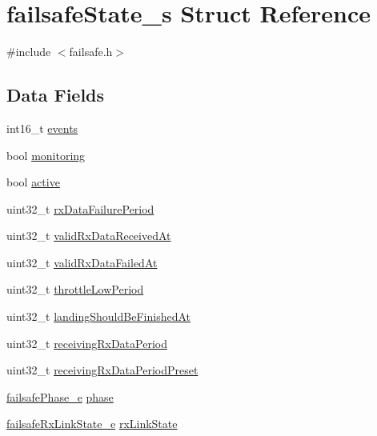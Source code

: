\hypertarget{structfailsafeState__s}{\section{failsafe\+State\+\_\+s Struct Reference}
\label{structfailsafeState__s}
}


{\ttfamily \#include $<$failsafe.\+h$>$}

\subsection*{Data Fields}
\begin{DoxyCompactItemize}
\item 
int16\+\_\+t \hyperlink{structfailsafeState__s_ab4ddace9d6b11a4979497cc5bf69dd05}{events}
\item 
bool \hyperlink{structfailsafeState__s_ae68d679effd677071564db5ead0bee7a}{monitoring}
\item 
bool \hyperlink{structfailsafeState__s_a327ffec6f10e40d22a082ca51f86f1ef}{active}
\item 
uint32\+\_\+t \hyperlink{structfailsafeState__s_a285d26fbce8889a67c0ce1fc693ab33d}{rx\+Data\+Failure\+Period}
\item 
uint32\+\_\+t \hyperlink{structfailsafeState__s_a08ccc134339909eb07ffd5b4668084f1}{valid\+Rx\+Data\+Received\+At}
\item 
uint32\+\_\+t \hyperlink{structfailsafeState__s_a484969c4ef0b0c3543719a29c51ad347}{valid\+Rx\+Data\+Failed\+At}
\item 
uint32\+\_\+t \hyperlink{structfailsafeState__s_adbb25522041f5e8eea5eba736af1e79e}{throttle\+Low\+Period}
\item 
uint32\+\_\+t \hyperlink{structfailsafeState__s_adbae38620a7cb8b9d5bd55ed3d81b8ac}{landing\+Should\+Be\+Finished\+At}
\item 
uint32\+\_\+t \hyperlink{structfailsafeState__s_a44e4901d91040b0ed454774f652c7390}{receiving\+Rx\+Data\+Period}
\item 
uint32\+\_\+t \hyperlink{structfailsafeState__s_aa83f85df219b946921a8704315cd5174}{receiving\+Rx\+Data\+Period\+Preset}
\item 
\hyperlink{flight_2failsafe_8h_ac818cdd9595e16dec1248366ceee914d}{failsafe\+Phase\+\_\+e} \hyperlink{structfailsafeState__s_adf772730db138b9082c1fa4b6b6e5b4d}{phase}
\item 
\hyperlink{flight_2failsafe_8h_a87da93a7d0bf77ce89ebc237b35f9663}{failsafe\+Rx\+Link\+State\+\_\+e} \hyperlink{structfailsafeState__s_a77d37bb755e3f609932702a972e1328d}{rx\+Link\+State}
\end{DoxyCompactItemize}


